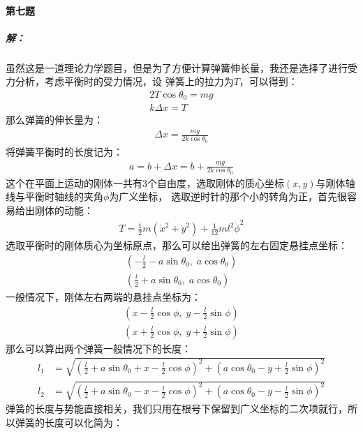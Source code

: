 \documentclass[a4paper]{ctexart}
\begin{document}
    \paragraph{第七题}
    \subparagraph{解：}
    虽然这是一道理论力学题目，但是为了方便计算弹簧伸长量，我还是选择了进行受力分析，考虑平衡时的受力情况，设
    弹簧上的拉力为$T$，可以得到：
    \begin{align}
        2T\cos\theta_{0} = mg\\
        k\Delta x = T
    \end{align}
    那么弹簧的伸长量为：
    \begin{align}
    \Delta x = \frac{mg}{2k\cos\theta_{0}}
    \end{align}
    将弹簧平衡时的长度记为：
    \begin{align}
        a = b + \Delta x = b + \frac{mg}{2k\cos\theta_{0}}
    \end{align}
    这个在平面上运动的刚体一共有3个自由度，选取刚体的质心坐标$(x, y)$与刚体轴线与平衡时轴线的夹角$\phi$为广义坐标，
    选取逆时针的那个小的转角为正，首先很容易给出刚体的动能：
    \begin{align}
        T = \frac{1}{2}m(\dot{x}^{2} + \dot{y}^{2}) + \frac{1}{12}ml^{2}\dot{\phi}^{2}
    \end{align}
    选取平衡时的刚体质心为坐标原点，那么可以给出弹簧的左右固定悬挂点坐标：
    \begin{align}
        \left(-\frac{l}{2} - a\sin\theta_{0},\; a\cos\theta_{0}\right)\\
        \left(\frac{l}{2} + a\sin\theta_{0},\; a\cos\theta_{0}\right)
    \end{align}
    一般情况下，刚体左右两端的悬挂点坐标为：
    \begin{align}
        \left(x - \frac{l}{2}\cos\phi,\;y - \frac{l}{2}\sin\phi\right)\\
        \left(x + \frac{l}{2}\cos\phi,\;y + \frac{l}{2}\sin\phi\right)
    \end{align}
    那么可以算出两个弹簧一般情况下的长度：
    \begin{align}
        l_{1} &= \sqrt{\left(\frac{l}{2} + a\sin\theta_{0} + x - \frac{l}{2}\cos\phi\right)^{2} + \left(a\cos\theta_{0} - y + \frac{l}{2}\sin\phi\right)^{2}}\\
        l_{2} &= \sqrt{\left(\frac{l}{2} + a\sin\theta_{0} - x - \frac{l}{2}\cos\phi\right)^{2} + \left(a\cos\theta_{0} - y - \frac{l}{2}\sin\phi\right)^{2}}
    \end{align}
    弹簧的长度与势能直接相关，我们只用在根号下保留到广义坐标的二次项就行，所以弹簧的长度可以化简为：
\end{document}
